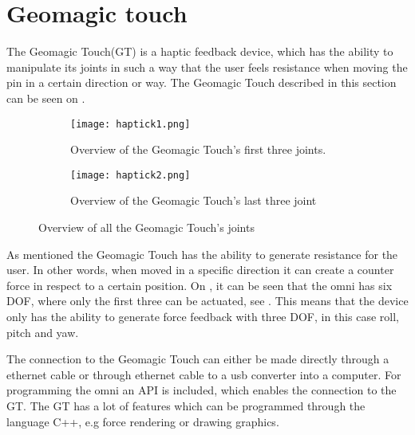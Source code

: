 \section{Geomagic touch}\label{sec:geo_magic}
The Geomagic Touch(GT) is a haptic feedback device, which has the ability to manipulate its joints in such a way that the user feels resistance when moving the pin in a certain direction or way. The Geomagic Touch described in this section can be seen on .

\begin{figure}[H]
	\centering
	\begin{subfigure}{.45\textwidth}
		\centering
		\texttt{[image: haptick1.png]}
		\caption{Overview of the Geomagic Touch's first three joints.}
		\label{fig:phantom1}
	\end{subfigure}
	\begin{subfigure}{.45\textwidth}
		\centering
		\texttt{[image: haptick2.png]}
		\caption{Overview of the Geomagic Touch's last three joint}
		\label{fig:phantom2}
	\end{subfigure}
\caption{Overview of all the Geomagic Touch's joints\cite{phantom_omni}}
\label{fig:phantom_omni}
\end{figure}

As mentioned the Geomagic Touch has the ability to generate resistance for the user. In other words, when moved in a specific direction it can create a counter force in respect to a certain position. On , it can be seen that the omni has six \gls{DOF}, where only the first three can be actuated, see . This means that the device only has the ability to generate force feedback with three \gls{DOF}, in this case roll, pitch and yaw.

The connection to the Geomagic Touch can either be made directly through a ethernet cable or through ethernet cable to a usb converter into a computer. For programming the omni an API is included, which enables the connection to the GT. The GT  has a lot of features which can be programmed through the language C++, e.g force rendering or drawing graphics.
